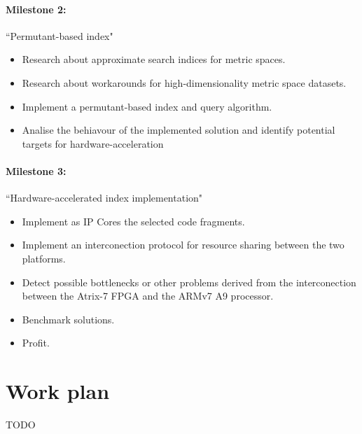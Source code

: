\documentclass[11pt,letterpaper]{article}
\begin{document}
\paragraph{Milestone 2:} ``Permutant-based index"
\begin{itemize}
\item Research about approximate search indices for metric spaces.
\item Research about workarounds for high-dimensionality metric space datasets.
\item Implement a permutant-based index and query algorithm.
\item Analise the behiavour of the implemented solution and identify potential targets for hardware-acceleration
\end{itemize}

\paragraph{Milestone 3:} ``Hardware-accelerated index implementation"
\begin{itemize}
\item Implement as IP Cores the selected code fragments.
\item Implement an interconection protocol for resource sharing between the two platforms.
\item Detect possible bottlenecks or other problems derived from the interconection between the Atrix-7 FPGA and the ARMv7 A9 processor.
\item Benchmark solutions.
\item Profit.
\end{itemize}

\section{Work plan}

TODO






\end{document}
